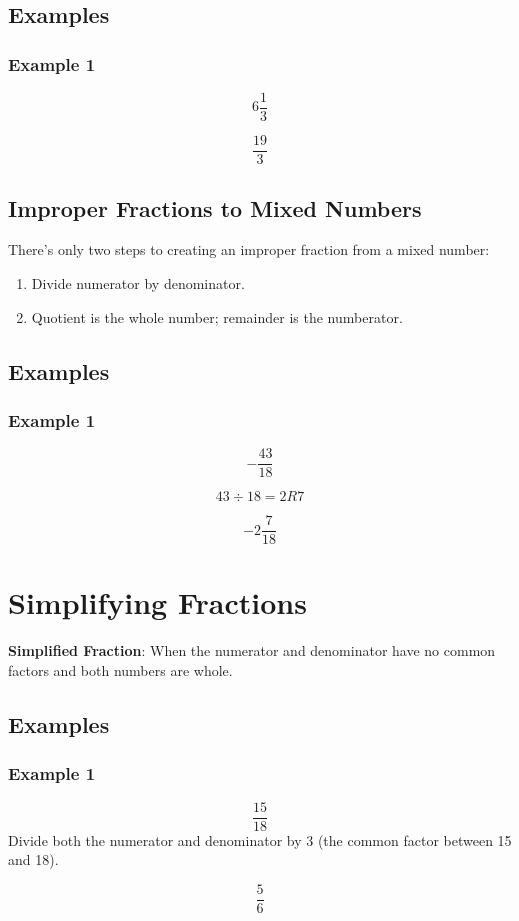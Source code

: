 \documentclass[letterpaper, 10pt]{article}
\begin{document}
\subsection{Examples}
\subsubsection{Example 1}
$$
6\frac{1}{3}
$$

$$
\frac{19}{3}
$$

\subsection{Improper Fractions to Mixed Numbers}
There's only two steps to creating an improper fraction from a mixed number: 
\begin{enumerate}
\item Divide numerator by denominator.
\item Quotient is the whole number; remainder is the numberator.
\end{enumerate}

\subsection{Examples}
\subsubsection{Example 1}
$$
-\frac{43}{18}
$$

$$
43 \div 18 = 2R7
$$

$$
-2\frac{7}{18}
$$

\section{Simplifying Fractions}
\noindent \textbf{Simplified Fraction}: When the numerator and denominator have no common factors and both numbers are whole.

\subsection{Examples}
\subsubsection{Example 1}
$$
\frac{15}{18}
$$
Divide both the numerator and denominator by 3 (the common factor between 15 and 18).

$$
\frac{5}{6}
$$
\end{document}
